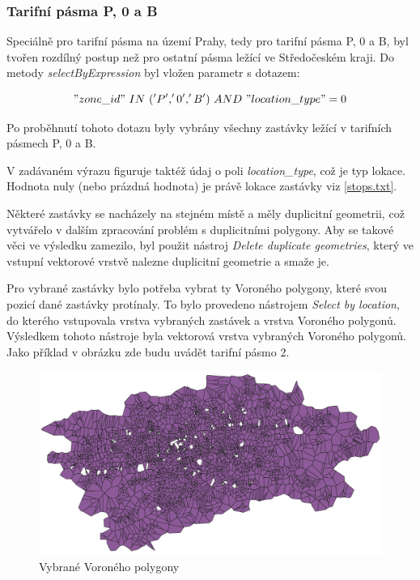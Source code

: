 \subsubsection{Tarifní pásma P, 0 a B}

Speciálně pro tarifní pásma na území Prahy, tedy pro tarifní pásma P, 0 a B, byl tvořen rozdílný postup
než pro ostatní pásma ležící ve Středočeském kraji. Do metody \textit{selectByExpression} byl vložen
parametr s dotazem: 

\["zone\_id"\ IN\ ('P','0','B')\ AND\ "location\_type" = 0\]

Po proběhnutí tohoto dotazu byly vybrány všechny zastávky ležící v tarifních pásmech P, 0 a B. 

V zadávaném výrazu figuruje taktéž údaj o poli \textit{location\_type}, což je typ lokace. 
Hodnota nuly (nebo prázdná hodnota) je právě lokace zastávky viz \ref{stops.txt}.

Některé zastávky se nacházely na stejném místě a měly duplicitní geometrii, což vytvářelo v dalším
zpracování problém s duplicitními polygony. Aby se takové věci ve výsledku zamezilo, byl použit nástroj   
\textit{Delete duplicate geometries}, který ve vstupní vektorové vrstvě nalezne duplicitní geometrie a smaže je.

Pro vybrané zastávky bylo potřeba vybrat ty Voroného polygony, které svou
pozicí dané zastávky protínaly. To bylo provedeno nástrojem \textit{Select by location},
do kterého vstupovala vrstva vybraných zastávek a vrstva Voroného polygonů. Výsledkem tohoto nástroje byla
vektorová vrstva vybraných Voroného polygonů. Jako příklad v obrázku zde budu uvádět tarifní pásmo 2.

\begin{figure}[H] \centering
    \includegraphics[width=400pt]{./pictures/voronoi-selected-P0B.png}
    \caption[Vybrané Voroného polygony]{Vybrané Voroného polygony}
	\label{fig:voronoi-selected}              
\end{figure}

